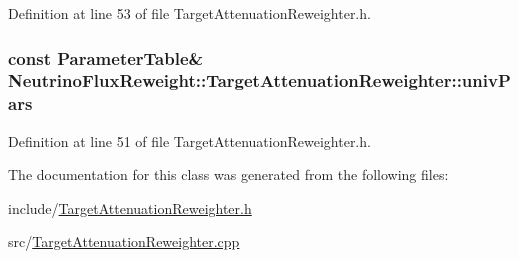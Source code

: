 Definition at line 53 of file Target\-Attenuation\-Reweighter.\-h.

\hypertarget{class_neutrino_flux_reweight_1_1_target_attenuation_reweighter_a7c23916d46501cf3e0ff3211830d9412}{
\subsubsection[{univ\-Pars}]{\setlength{\rightskip}{0pt plus 5cm}const {\bf Parameter\-Table}\& Neutrino\-Flux\-Reweight\-::\-Target\-Attenuation\-Reweighter\-::univ\-Pars\hspace{0.3cm}{\ttfamily [private]}}}\label{class_neutrino_flux_reweight_1_1_target_attenuation_reweighter_a7c23916d46501cf3e0ff3211830d9412}


Definition at line 51 of file Target\-Attenuation\-Reweighter.\-h.



The documentation for this class was generated from the following files\-:\begin{DoxyCompactItemize}
\item 
include/\hyperlink{_target_attenuation_reweighter_8h}{Target\-Attenuation\-Reweighter.\-h}\item 
src/\hyperlink{_target_attenuation_reweighter_8cpp}{Target\-Attenuation\-Reweighter.\-cpp}\end{DoxyCompactItemize}
